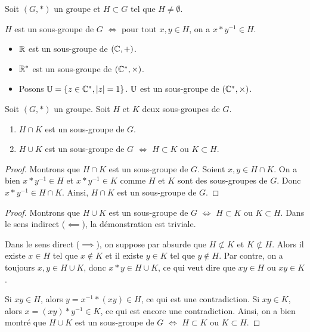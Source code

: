 \documentclass[11pt,a4paper]{report}
\begin{document}
\begin{property}
    Soit $(G, *)$ un groupe et $H \subset G$ tel que $H \neq \emptyset$.

    $H$ est un sous-groupe de $G$ $\iff$ pour tout $x,y \in H$, on a $x * y^{-1} \in H$.
\end{property}

\begin{example}
    \begin{itemize}
        \item $\mathbb{R}$ est un sous-groupe de $(\mathbb{C},+)$.
        \item $\mathbb{R}^*$ est un sous-groupe de $(\mathbb{C}^*,\times)$.
        \item Posons $\mathbb{U} = \{ z \in \mathbb{C}^*, |z| = 1 \}$. $\mathbb{U}$ est un sous-groupe de $(\mathbb{C}^*,\times)$.
    \end{itemize}
\end{example}

\begin{property}
    Soit $(G,*)$ un groupe. Soit $H$ et $K$ deux sous-groupes de $G$.
    \begin{enumerate}
        \item $H \cap K$ est un sous-groupe de $G$.
        \item $H \cup K$ est un sous-groupe de $G$ $\iff$ $H \subset K$ ou $K \subset H$.
    \end{enumerate}
\end{property}

\begin{proof}
    Montrons que $H \cap K$ est un sous-groupe de $G$. Soient $x,y \in H \cap K$. On a bien $x * y^{-1} \in H$ et $x * y^{-1} \in K$ comme $H$ et $K$ sont des sous-groupes de $G$. Donc $x * y^{-1} \in H \cap K$. Ainsi, $H \cap K$ est un sous-groupe de $G$.
\end{proof}

\begin{proof}
    Montrons que $H \cup K$ est un sous-groupe de $G$ $\iff$ $H \subset K$ ou $K \subset H$. Dans le sens indirect ($\impliedby$), la démonstration est triviale.
    
    Dans le sens direct ($\implies$), on suppose par absurde que $H \not\subset K$ et $K \not\subset H$. Alors il existe $x \in H$ tel que $x \notin K$ et il existe $y \in K$ tel que $y \notin H$. Par contre, on a toujours $x,y \in H \cup K$, donc $x * y \in H \cup K$, ce qui veut dire que $xy \in H$ ou $xy \in K$.
    
    Si $xy \in H$, alors $y = x^{-1} * (xy) \in H$, ce qui est une contradiction. Si $xy \in K$, alors $x = (xy) * y^{-1} \in K$, ce qui est encore une contradiction. Ainsi, on a bien montré que $H \cup K$ est un sous-groupe de $G$ $\iff$ $H \subset K$ ou $K \subset H$.
\end{proof}
\end{document}
